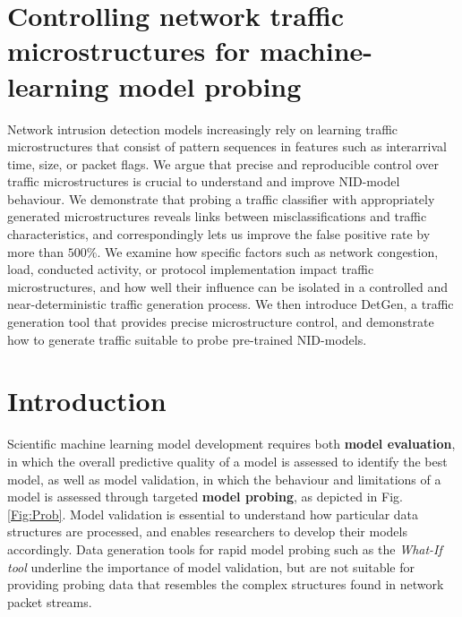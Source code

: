  
\section{Controlling network traffic microstructures for machine-learning model probing}

Network intrusion detection models increasingly rely on learning traffic microstructures that consist of pattern sequences in features such as interarrival time, size, or packet flags. We argue that precise and reproducible control over traffic microstructures is crucial to understand and improve NID-model behaviour.
We demonstrate that probing a traffic classifier with appropriately generated microstructures reveals links between misclassifications and traffic characteristics, and correspondingly lets us improve the false positive rate by more than $500\%$. We examine how specific factors such as network congestion, load, conducted activity, or protocol implementation impact traffic microstructures, and how well their influence can be isolated in a controlled and near-deterministic traffic generation process. We then introduce DetGen, a traffic generation tool that provides precise microstructure control, and demonstrate how to generate traffic suitable to probe pre-trained NID-models.



\section{Introduction}



Scientific machine learning model development requires both \textbf{model evaluation}, in which the overall predictive quality of a model is assessed to identify the best model, as well as model validation, in which the behaviour and limitations of a model is assessed through targeted \textbf{model probing}, as depicted in Fig. \ref{Fig:Prob}. Model validation is essential to understand how particular data structures are processed, and enables researchers to develop their models accordingly. Data generation tools for rapid model probing such as the \textit{What-If tool} \cite{wexler2019if} underline the importance of model validation, but are not suitable for providing probing data that resembles the complex structures found in network packet streams.

